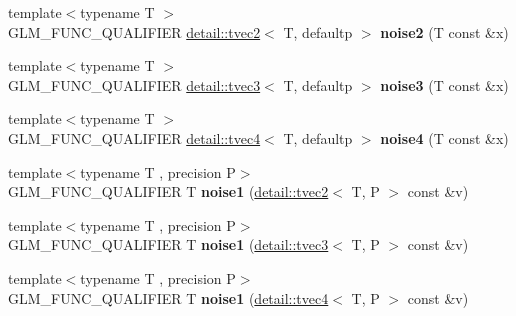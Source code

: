 \begin{DoxyCompactItemize}
\item 
{\footnotesize template$<$typename T $>$ }\\G\+L\+M\+\_\+\+F\+U\+N\+C\+\_\+\+Q\+U\+A\+L\+I\+F\+I\+ER \hyperlink{structglm_1_1detail_1_1tvec2}{detail\+::tvec2}$<$ T, defaultp $>$ {\bfseries noise2} (T const \&x)\hypertarget{namespaceglm_a934f962ac6c9780c1b9aa7f0b2c36cfc}{}\label{namespaceglm_a934f962ac6c9780c1b9aa7f0b2c36cfc}

\item 
{\footnotesize template$<$typename T $>$ }\\G\+L\+M\+\_\+\+F\+U\+N\+C\+\_\+\+Q\+U\+A\+L\+I\+F\+I\+ER \hyperlink{structglm_1_1detail_1_1tvec3}{detail\+::tvec3}$<$ T, defaultp $>$ {\bfseries noise3} (T const \&x)\hypertarget{namespaceglm_a195da32ebfea1c706a6a7e5a08838575}{}\label{namespaceglm_a195da32ebfea1c706a6a7e5a08838575}

\item 
{\footnotesize template$<$typename T $>$ }\\G\+L\+M\+\_\+\+F\+U\+N\+C\+\_\+\+Q\+U\+A\+L\+I\+F\+I\+ER \hyperlink{structglm_1_1detail_1_1tvec4}{detail\+::tvec4}$<$ T, defaultp $>$ {\bfseries noise4} (T const \&x)\hypertarget{namespaceglm_a034c132519dcf2e11725910dbfd466ce}{}\label{namespaceglm_a034c132519dcf2e11725910dbfd466ce}

\item 
{\footnotesize template$<$typename T , precision P$>$ }\\G\+L\+M\+\_\+\+F\+U\+N\+C\+\_\+\+Q\+U\+A\+L\+I\+F\+I\+ER T {\bfseries noise1} (\hyperlink{structglm_1_1detail_1_1tvec2}{detail\+::tvec2}$<$ T, P $>$ const \&v)\hypertarget{namespaceglm_a6efe792fcb5730d715e2876db85e1e54}{}\label{namespaceglm_a6efe792fcb5730d715e2876db85e1e54}

\item 
{\footnotesize template$<$typename T , precision P$>$ }\\G\+L\+M\+\_\+\+F\+U\+N\+C\+\_\+\+Q\+U\+A\+L\+I\+F\+I\+ER T {\bfseries noise1} (\hyperlink{structglm_1_1detail_1_1tvec3}{detail\+::tvec3}$<$ T, P $>$ const \&v)\hypertarget{namespaceglm_a61a2448910dff94fb4b05826f8a49fbe}{}\label{namespaceglm_a61a2448910dff94fb4b05826f8a49fbe}

\item 
{\footnotesize template$<$typename T , precision P$>$ }\\G\+L\+M\+\_\+\+F\+U\+N\+C\+\_\+\+Q\+U\+A\+L\+I\+F\+I\+ER T {\bfseries noise1} (\hyperlink{structglm_1_1detail_1_1tvec4}{detail\+::tvec4}$<$ T, P $>$ const \&v)\hypertarget{namespaceglm_a8cd64bc969898037123e36a45f56a330}{}\label{namespaceglm_a8cd64bc969898037123e36a45f56a330}


\end{DoxyCompactItemize}
